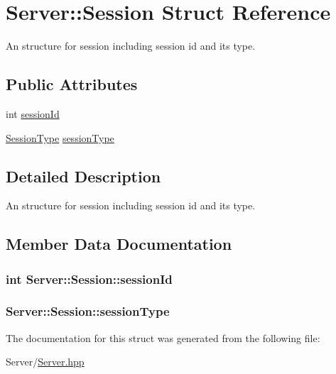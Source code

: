 \hypertarget{structServer_1_1Session}{}\section{Server\+:\+:Session Struct Reference}
\label{structServer_1_1Session}


An structure for session including session id and its type.  


\subsection*{Public Attributes}
\begin{DoxyCompactItemize}
\item 
int \hyperlink{structServer_1_1Session_adb3fcb9d4bb8f7bd102d16ac3ba1f434}{session\+Id}
\item 
\hyperlink{classServer_abb49932aed3c7683040e1a463e25c36c}{Session\+Type} \hyperlink{structServer_1_1Session_a3d598a0da58b1882678cb4e2d9712611}{session\+Type}
\end{DoxyCompactItemize}


\subsection{Detailed Description}
An structure for session including session id and its type. 

\subsection{Member Data Documentation}
\subsubsection[{\texorpdfstring{session\+Id}{sessionId}}]{\setlength{\rightskip}{0pt plus 5cm}int Server\+::\+Session\+::session\+Id}\hypertarget{structServer_1_1Session_adb3fcb9d4bb8f7bd102d16ac3ba1f434}{}\label{structServer_1_1Session_adb3fcb9d4bb8f7bd102d16ac3ba1f434}
\subsubsection[{\texorpdfstring{session\+Type}{sessionType}}]{ Server\+::\+Session\+::session\+Type}\hypertarget{structServer_1_1Session_a3d598a0da58b1882678cb4e2d9712611}{}\label{structServer_1_1Session_a3d598a0da58b1882678cb4e2d9712611}


The documentation for this struct was generated from the following file\+:\begin{DoxyCompactItemize}
\item 
Server/\hyperlink{Server_8hpp}{Server.\+hpp}\end{DoxyCompactItemize}
